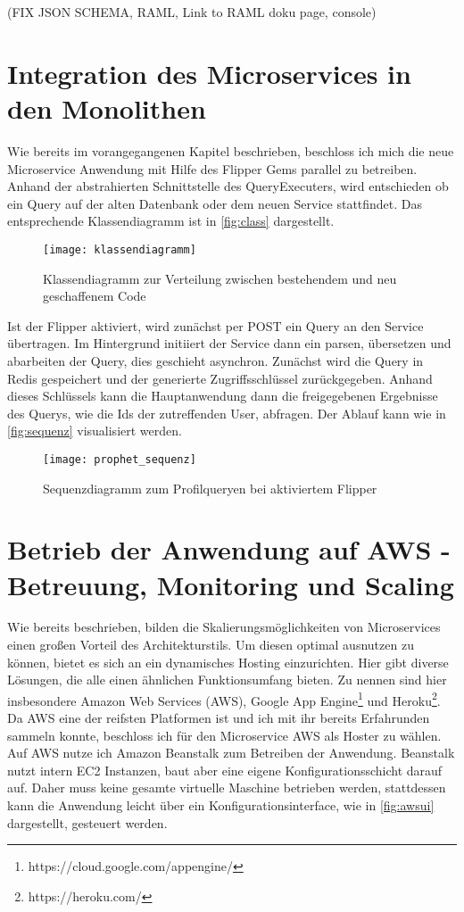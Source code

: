(FIX JSON SCHEMA, RAML, Link to RAML doku page, console)

\section{Integration des Microservices in den Monolithen}
Wie bereits im vorangegangenen Kapitel beschrieben, beschloss ich mich die neue Microservice Anwendung mit Hilfe des Flipper Gems parallel zu betreiben. Anhand der abstrahierten Schnittstelle des QueryExecuters, wird entschieden ob ein Query auf der alten Datenbank oder dem neuen Service stattfindet. Das entsprechende Klassendiagramm ist in \autoref{fig:class} dargestellt.
\begin{figure}[!ht]
    \centering
    \caption{Klassendiagramm zur Verteilung zwischen bestehendem und neu geschaffenem Code}
    \label{fig:class}
    \texttt{[image: klassendiagramm]}
\end{figure}

Ist der Flipper aktiviert, wird zunächst per POST ein Query an den Service übertragen. Im Hintergrund initiiert der Service dann ein parsen, übersetzen und abarbeiten der Query, dies geschieht asynchron. Zunächst wird die Query in Redis gespeichert und der generierte Zugriffsschlüssel zurückgegeben.
Anhand dieses Schlüssels kann die Hauptanwendung dann die freigegebenen Ergebnisse des Querys, wie die Ids der zutreffenden User, abfragen. Der Ablauf kann wie in \autoref{fig:sequenz} visualisiert werden.

\begin{figure}[!ht]
    \centering
    \caption{Sequenzdiagramm zum Profilqueryen bei aktiviertem Flipper}
    \label{fig:sequenz}
    \texttt{[image: prophet\_sequenz]}
\end{figure}

\section{Betrieb der Anwendung auf AWS - Betreuung, Monitoring und Scaling}
Wie bereits beschrieben, bilden die Skalierungsmöglichkeiten von Microservices einen großen Vorteil des Architekturstils. Um diesen optimal ausnutzen zu können, bietet es sich an ein dynamisches Hosting einzurichten. Hier gibt diverse Lösungen, die alle einen ähnlichen Funktionsumfang bieten. Zu nennen sind hier insbesondere Amazon Web Services (AWS), Google App Engine\footnote{https://cloud.google.com/appengine/} und Heroku\footnote{https://heroku.com/}. Da AWS eine der reifsten Platformen ist und ich mit ihr bereits Erfahrunden sammeln konnte, beschloss ich für den Microservice AWS als Hoster zu wählen.
Auf AWS nutze ich Amazon Beanstalk zum Betreiben der Anwendung. Beanstalk nutzt intern EC2 Instanzen, baut aber eine eigene Konfigurationsschicht darauf auf. Daher muss keine gesamte virtuelle Maschine betrieben werden, stattdessen kann die Anwendung leicht über ein Konfigurationsinterface, wie in \autoref{fig:awsui} dargestellt, gesteuert werden.

